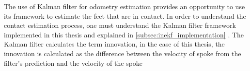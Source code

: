 \documentclass[report.tex]{subfiles}
\begin{document}
    The use of Kalman filter for odometry estimation provides an opportunity to use its framework to estimate the feet that are in contact.
    In order to understand the contact estimation process, one must understand the Kalman filter framework implemented in this thesis and explained in \ref{subsec:inekf_implementation} . The Kalman filter calculates the term innovation, in the case of this thesis, the innovation is calculated as the difference between the velocity of spoke from the filter's prediction and the velocity of the spoke 
    
    
\end{document}
